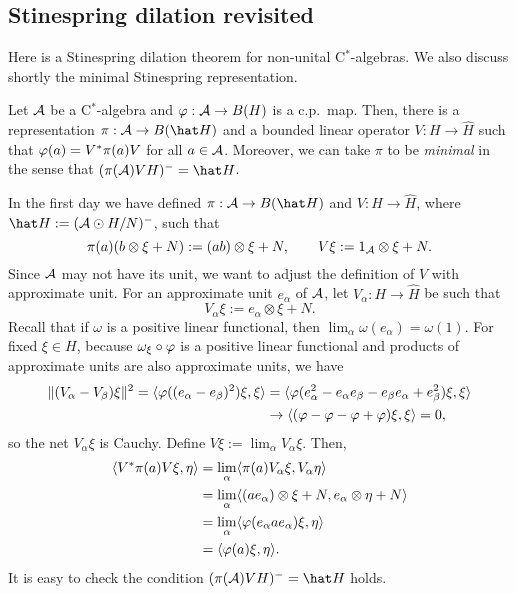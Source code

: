 \documentclass{../../small}
\begin{document}
\subsection{Stinespring dilation revisited}

Here is a Stinespring dilation theorem for non-unital C$^*$-algebras.
We also discuss shortly the minimal Stinespring representation.

\begin{thm}
Let $\mathcal{A}$ be a C$^*$-algebra and $\varphi:\mathcal{A}\to B(H)$ is a c.p.~map.
Then, there is a representation $\pi:\cA\to B(\hat H)$ and a bounded linear operator $V:H\to\hat H$ such that $\varphi(a)=V^*\pi(a)V$ for all $a\in\mathcal{A}$.
Moreover, we can take $\pi$ to be \emph{minimal} in the sense that $(\pi(\cA)VH)^-=\hat H$.
\end{thm}
\begin{pf}
In the first day we have defined $\pi:\cA\to B(\hat H)$ and $V:H\to\hat H$, where $\hat H:=(\cA\odot H/N)^-$, such that
\[\pi(a)(b\otimes\xi+N):=(ab)\otimes\xi+N,\qquad V\xi:=1_{\mathcal{A}}\otimes\xi+N.\]
Since $\mathcal{A}$ may not have its unit, we want to adjust the definition of $V$ with approximate unit.
For an approximate unit $e_\alpha$ of $\mathcal{A}$, let $V_\alpha:H\to\hat H$ be such that
\[V_\alpha\xi:=e_\alpha\otimes\xi+N.\]
Recall that if $\omega$ is a positive linear functional, then $\lim_\alpha\omega(e_\alpha)=\omega(1)$.
For fixed $\xi\in H$, because $\omega_\xi\circ\varphi$ is a positive linear functional and products of approximate units are also approximate units, we have
\begin{align*}
\|(V_\alpha-V_\beta)\xi\|^2=\langle\varphi((e_\alpha-e_\beta)^2)\xi,\xi\rangle&=\langle\varphi(e_\alpha^2-e_\alpha e_\beta-e_\beta e_\alpha+e_\beta^2)\xi,\xi\rangle\\
&\to\langle(\varphi-\varphi-\varphi+\varphi)\xi,\xi\rangle=0,
\end{align*}
so the net $V_\alpha\xi$ is Cauchy.
Define $V\xi:=\lim_\alpha V_\alpha\xi$.
Then,
\begin{align*}
\langle V^*\pi(a)V\xi,\eta\rangle
&=\lim_\alpha\langle\pi(a)V_\alpha\xi,V_\alpha\eta\rangle\\
&=\lim_\alpha\langle(ae_\alpha)\otimes\xi+N,e_\alpha\otimes\eta+N\rangle\\
&=\lim_\alpha\langle\varphi(e_\alpha ae_\alpha)\xi,\eta\rangle\\
&=\langle\varphi(a)\xi,\eta\rangle.
\end{align*}
It is easy to check the condition $(\pi(\cA)VH)^-=\hat H$ holds.
\end{pf}
\end{document}
